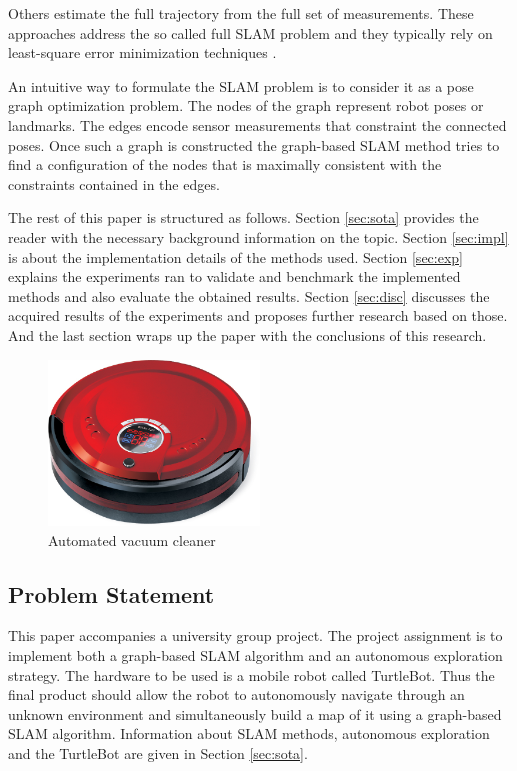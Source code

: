 \documentclass{ba-kecs}
\begin{document}
Others estimate the full trajectory from the full set of measurements. These approaches address the so called full SLAM problem and they typically rely on least-square error minimization techniques \cite{Leastsquares}.

An intuitive way to formulate the SLAM problem is to consider it as a pose graph optimization problem. The nodes of the graph represent robot poses or landmarks. The edges encode sensor measurements that constraint the connected poses. Once such a graph is constructed the graph-based SLAM method tries to find a configuration of the nodes that is maximally consistent with the constraints contained in the edges.

The rest of this paper is structured as follows. Section \ref{sec:sota} provides the reader with the necessary background information on the topic. Section \ref{sec:impl} is about the implementation details of the methods used. Section \ref{sec:exp} explains the experiments ran to validate and benchmark the implemented methods and also evaluate the obtained results. Section \ref{sec:disc} discusses the acquired results of the experiments and proposes further research based on those. And the last section wraps up the paper with the conclusions of this research.

\begin{figure}[htp]
	\centering
		\includegraphics[width=0.50\textwidth]{figures/vacuum_cleaner.jpg}
	\caption{Automated vacuum cleaner}
	\label{fig:vacuum_cleaner}
\end{figure}

\subsection{Problem Statement}
\label{sec:problem}
This paper accompanies a university group project. The project assignment is to implement both a graph-based SLAM algorithm and an autonomous exploration strategy. The hardware to be used is a mobile robot called TurtleBot. Thus the final product should allow the robot to autonomously navigate through an unknown environment and simultaneously build a map of it using a graph-based SLAM algorithm. Information about SLAM methods, autonomous exploration and the TurtleBot are given in Section \ref{sec:sota}.  
\end{document}
